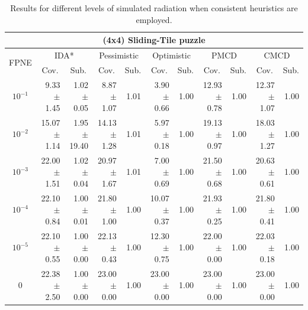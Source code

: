\documentclass[letterpaper]{article}
\begin{document}
\begin{table}[t]
\begin{tabular}{| c | r  r | r  r | r  r | r  r | r  r |}
\hline
\hline
\multicolumn{11}{|c|}{\textbf{(4x4) Sliding-Tile puzzle}} \\
\hline
\multirow{2}{*}{FPNE}	& \multicolumn{2}{|c|}{IDA*} 	& \multicolumn{2}{|c|}{Pessimistic} 	& \multicolumn{2}{|c|}{Optimistic} 	& \multicolumn{2}{|c|}{PMCD} 	& \multicolumn{2}{|c|}{CMCD} 	\\
\cline{2-11} 
	& \multicolumn{1}{c}{Cov.} & \multicolumn{1}{c|}{Sub.} 	& \multicolumn{1}{c}{Cov.} & \multicolumn{1}{c|}{Sub.} 	& \multicolumn{1}{c}{Cov.} & \multicolumn{1}{c|}{Sub.} 	& \multicolumn{1}{c}{Cov.} & \multicolumn{1}{c|}{Sub.} 	& \multicolumn{1}{c}{Cov.} & \multicolumn{1}{c|}{Sub.} 	\\
\hline

$10^{-1}$	& 9.33 $\pm$ 1.45	& 1.02 $\pm$ 0.05	& 8.87 $\pm$ 1.07	& 1.01	& 3.90 $\pm$ 0.66	& 1.00	& 12.93 $\pm$ 0.78	& 1.00	& 12.37 $\pm$ 1.07 & 1.00	\\

$10^{-2}$	& 15.07 $\pm$ 1.14	& 1.95 $\pm$ 19.40	& 14.13 $\pm$ 1.28	& 1.01	& 5.97 $\pm$ 0.18	& 1.00	& 19.13 $\pm$ 0.97	& 1.00	& 18.03 $\pm$ 1.27 & 1.00	\\

$10^{-3}$	& 22.00 $\pm$ 1.51	& 1.02 $\pm$ 0.04	& 20.97 $\pm$ 1.67	& 1.01	& 7.00 $\pm$ 0.69	& 1.00	& 21.50 $\pm$ 0.68	& 1.00	& 20.63 $\pm$ 0.61 & 1.00	\\

$10^{-4}$	& 22.10 $\pm$ 0.84	& 1.00 $\pm$ 0.01	& 21.80 $\pm$ 1.00	& 1.00	& 10.07 $\pm$ 0.37	& 1.00	& 21.93 $\pm$ 0.25	& 1.00	& 21.80 $\pm$ 0.41 & 1.00	\\

$10^{-5}$	& 22.10 $\pm$ 0.55	& 1.00 $\pm$ 0.00	& 22.13 $\pm$ 0.43	& 1.00	& 12.30 $\pm$ 0.75	& 1.00	& 22.00 $\pm$ 0.00	& 1.00	& 22.03 $\pm$ 0.18 & 1.00	\\



0 	& 22.38 $\pm$ 2.50	& 1.00  $\pm$ 0.00 	& 23.00 $\pm$ 0.00 & 1.00  & 23.00 $\pm$ 0.00 & 1.00  & 23.00 $\pm$ 0.00 & 1.00  & 23.00 $\pm$ 0.00 & 1.00 	\\
\hline
\end{tabular}
\caption{Results for different levels of simulated radiation when consistent heuristics are employed.}
\label{tab:results}
\end{table}
\end{document}
